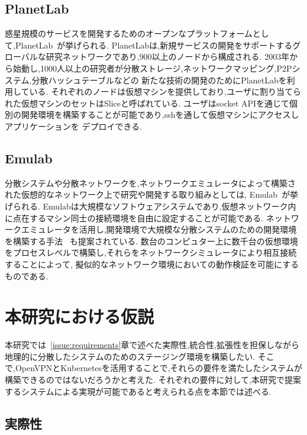 {\subsection{PlanetLab}
\label{consideration:related-works:planetlab}

惑星規模のサービスを開発するためのオープンなプラットフォームとして,PlanetLab~\cite{PlanetLab}が挙げられる.
PlanetLabは,新規サービスの開発をサポートするグローバルな研究ネットワークであり,900以上のノードから構成される.
2003年から始動し,1000人以上の研究者が分散ストレージ,ネットワークマッピング,P2Pシステム,分散ハッシュテーブルなどの
新たな技術の開発のためにPlanetLabを利用している.
それぞれのノードは仮想マシンを提供しており,ユーザに割り当てられた仮想マシンのセットはSliceと呼ばれている.
ユーザはsocket APIを通じて個別の開発環境を構築することが可能であり,sshを通して仮想マシンにアクセスしアプリケーションを
デプロイできる.

\subsection{Emulab}
\label{consideration:related-works:emulab}

分散システムや分散ネットワークを,ネットワークエミュレータによって構築された仮想的なネットワーク上で研究や開発する取り組みとしては,
Emulab~\cite{Emulab}が挙げられる.
Emulabは大規模なソフトウェアシステムであり,仮想ネットワーク内に点在するマシン同士の接続環境を自由に設定することが可能である.
ネットワークエミュレータを活用し,開発環境で大規模な分散システムのための開発環境を構築する手法
~\cite{RelatedWork1}も提案されている.
数台のコンピュター上に数千台の仮想環境をプロセスレベルで構築し,それらをネットワークシミュレータにより相互接続することによって,
擬似的なネットワーク環境においての動作検証を可能にするものである.

\section{本研究における仮説}
\label{issue:hypothesis}

本研究では~\ref{issue:requirements}章で述べた実際性,統合性,拡張性を担保しながら地理的に分散したシステムのためのステージング環境を構築したい.
そこで,OpenVPNとKubernetesを活用することで,それらの要件を満たしたシステムが構築できるのではないだろうかと考えた.
それぞれの要件に対して,本研究で提案するシステムによる実現が可能であると考えられる点を本節では述べる.

\subsection{実際性}

}
